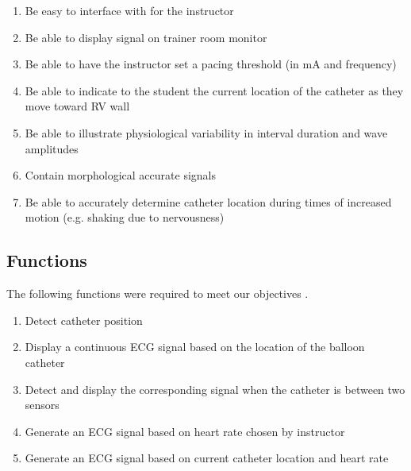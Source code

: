 \documentclass[12pt, titlepage]{article}
\begin{document}
\begin{enumerate}
  \item Be easy to interface with for the instructor
  \item Be able to display signal on trainer room monitor
  \item Be able to have the instructor set a pacing threshold (in mA and frequency)
  \item Be able to indicate to the student the current location of the catheter as they move toward RV wall
  \item Be able to illustrate physiological variability in interval duration and wave amplitudes
  \item Contain morphological accurate signals
  \item Be able to accurately determine catheter location during times of increased motion (e.g. shaking due to nervousness)
\end{enumerate}


\subsection{Functions}
The following functions were required to meet our objectives \cite{backgroundreport}.

\begin{enumerate}
  \item Detect catheter position
  \item Display a continuous ECG signal based on the location of the balloon catheter
  \item Detect and display the corresponding signal when the catheter is between two sensors
  \item Generate an ECG signal based on heart rate chosen by instructor
  \item Generate an ECG signal based on current catheter location and heart rate
\end{enumerate}

\clearpage


\end{document}
